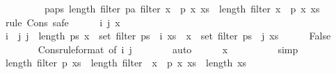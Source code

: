 \begin{isabellebody}
\ \ \isamarkupfalse%
\isanewline
\ \ \isamarkupfalse%
\isanewline
\ \ \isamarkupfalse%
\ {\isachardoublequoteopen}{\isacharparenleft}{\isasymSum}pa{\isasymleftarrow}ps{\isachardot}\ length\ {\isacharparenleft}filter\ pa\ {\isacharparenleft}filter\ {\isacharparenleft}{\isasymlambda}x{\isachardot}\ {\isasymnot}\ p\ x{\isacharparenright}\ xs{\isacharparenright}{\isacharparenright}{\isacharparenright}\ {\isasymle}\ length\ {\isacharparenleft}filter\ {\isacharparenleft}{\isasymlambda}x{\isachardot}\ {\isasymnot}\ p\ x{\isacharparenright}\ xs{\isacharparenright}{\isachardoublequoteclose}\isanewline
\ \ \isamarkupfalse%
\ {\isacharparenleft}rule\ Cons{\isacharparenleft}{}{\isacharparenright}{\isacharcomma}\ safe{\isacharparenright}\isanewline
\ \ \ \ \isamarkupfalse%
\ i\ j\ x\isanewline
\ \ \ \ \isamarkupfalse%
\ {\isachardoublequoteopen}i\ {\isacharless}\ j{\isachardoublequoteclose}\ {\isachardoublequoteopen}j\ {\isacharless}\ length\ ps{\isachardoublequoteclose}\ {\isachardoublequoteopen}x\ {\isasymin}\ set\ {\isacharparenleft}filter\ {\isacharparenleft}ps\ {\isacharbang}\ i{\isacharparenright}\ {\isacharquery}xs{\isacharprime}{\isacharparenright}{\isachardoublequoteclose}\ \ {\isachardoublequoteopen}x\ {\isasymin}\ set\ {\isacharparenleft}filter\ {\isacharparenleft}ps\ {\isacharbang}\ j{\isacharparenright}\ {\isacharquery}xs{\isacharprime}{\isacharparenright}{\isachardoublequoteclose}\isanewline
\ \ \ \ \isamarkupfalse%
\ False\isanewline
\ \ \ \ \ \ \isamarkupfalse%
\ Cons{\isacharparenleft}{}{\isacharparenright}{\isacharbrackleft}rule{\isacharunderscore}format{\isacharcomma}\ of\ {\isachardoublequoteopen}i{\isacharplus}{}{\isachardoublequoteclose}\ {\isachardoublequoteopen}j{\isacharplus}{}{\isachardoublequoteclose}{\isacharbrackright}\isanewline
\ \ \ \ \ \ \isamarkupfalse%
\ auto\isanewline
\ \ \ \ \isamarkupfalse%
\ {\isachardoublequoteopen}x\ {\isasymin}\ {\isacharbraceleft}{\isacharbraceright}{\isachardoublequoteclose}\isanewline
\ \ \ \ \ \ \isamarkupfalse%
\ simp\isanewline
\ \ \isamarkupfalse%
\isanewline
\isanewline
\ \ \isamarkupfalse%
\isanewline
\ \ \isamarkupfalse%
\ {\isachardoublequoteopen}length\ {\isacharparenleft}filter\ p\ xs{\isacharparenright}\ {\isacharplus}\ length\ {\isacharparenleft}filter\ {\isacharparenleft}{\isasymlambda}\ x{\isachardot}\ {\isasymnot}\ p\ x{\isacharparenright}\ xs{\isacharparenright}\ {\isacharequal}\ length\ xs{\isachardoublequoteclose}\isanewline

\end{isabellebody}
